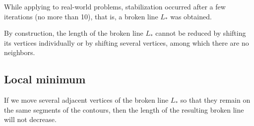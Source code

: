 \documentclass[]{llncs}
\begin{document}
\begin{remark}
While applying to real-world problems,
stabilization occurred after a few iterations
(no more than 10),
that is, a broken line
$L_*$ was obtained.
\end{remark}

By construction,
the length of the broken line
$L_*$
cannot be reduced by shifting its vertices individually
or by shifting several vertices,
among which there are no neighbors.

\subsection{Local minimum}

\begin{proposition}
If we move several adjacent vertices of the broken line
$L_*$
so that they remain on the same segments of the contours,
then the length of the resulting broken line will not decrease.
\end{proposition}
\end{document}
